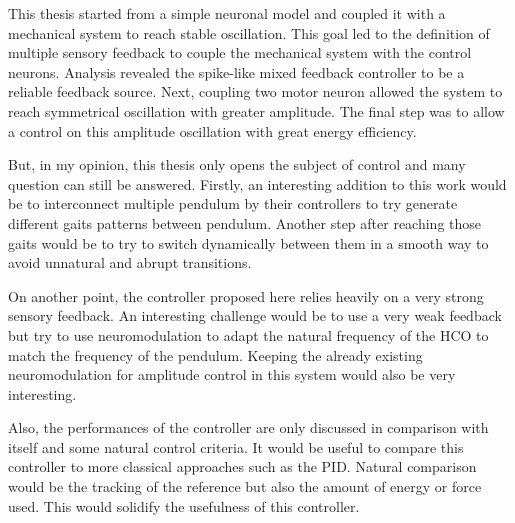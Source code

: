 This thesis started from a simple neuronal model and coupled it with a mechanical system to reach stable oscillation. This goal led to the definition of multiple sensory feedback to couple the mechanical system with the control neurons. Analysis revealed the spike-like mixed feedback controller to be a reliable feedback source. Next, coupling two motor neuron allowed the system to reach symmetrical oscillation with greater amplitude. The final step was to allow a control on this amplitude oscillation with great energy efficiency. 

But, in my opinion, this thesis only opens the subject of control and many question can still be answered. Firstly, an interesting addition to this work would be to interconnect multiple pendulum by their controllers to try generate different gaits patterns between pendulum. Another step after reaching those gaits would be to try to switch dynamically between them in a smooth way to avoid unnatural and abrupt transitions.

On another point, the controller proposed here relies heavily on a very strong sensory feedback. An interesting challenge would be to use a very weak feedback but try to use neuromodulation to adapt the natural frequency of the HCO to match the frequency of the pendulum. Keeping the already existing neuromodulation for amplitude control in this system would also be very interesting.

Also, the performances of the controller are only discussed in comparison with itself and some natural control criteria. It would be useful to compare this controller to more classical approaches such as the PID. Natural comparison would be the tracking of the reference but also the amount of energy or force used. This would solidify the usefulness of this controller.
